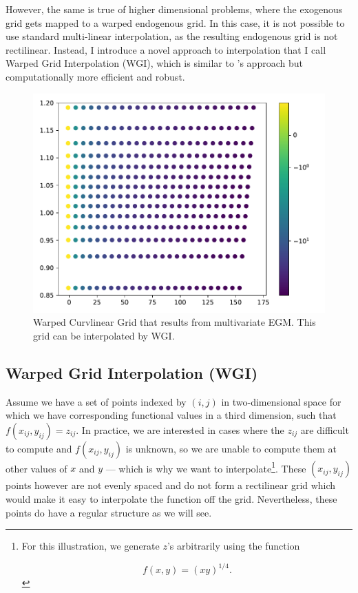 \documentclass{article}
\begin{document}
However, the same is true of higher dimensional problems, where the exogenous grid gets mapped to a warped endogenous grid. In this case, it is not possible to use standard multi-linear interpolation, as the resulting endogenous grid is not rectilinear. Instead, I introduce a novel approach to interpolation that I call Warped Grid Interpolation (WGI), which is similar to \citet{White2015}'s approach but computationally more efficient and robust.

\begin{figure}[!htbp]
\centering
\includegraphics[width=0.7\linewidth]{files/LaborSeparableWarped-9ccc6cd79ef86eff27837bd6d00bd9cc.pdf}
\caption{Warped Curvlinear Grid that results from multivariate EGM. This grid can be interpolated by WGI.}
\label{fig:LaborSeparableWarpedGrid}
\end{figure}

\subsection{Warped Grid Interpolation (WGI)}\label{Warped Grid Interpolation (WGI)}

Assume we have a set of points indexed by $(i,j)$ in two-dimensional space for which we have corresponding functional values in a third dimension, such that $f(x_{ij},y_{ij}) = z_{ij}$. In practice, we are interested in cases where the $z_{ij}$ are difficult to compute and $f(x_{ij},y_{ij})$ is unknown, so we are unable to compute them at other values of $x$ and $y$ --- which is why we want to interpolate\footnote{For this illustration, we generate $z$'s arbitrarily using the function

\begin{equation}
f(x,y) = (xy)^{1/4}.
\end{equation}}. These $(x_{ij},y_{ij})$ points however are not evenly spaced and do not form a rectilinear grid which would make it easy to interpolate the function off the grid. Nevertheless, these points do have a regular structure as we will see.
\end{document}
